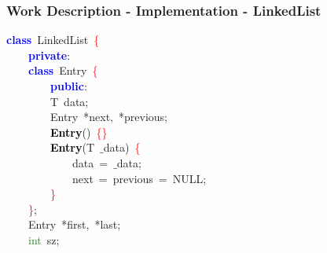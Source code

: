 \documentclass[table, usenames,dvipsnames,svgnames]{beamer}
\begin{document}
\begin{frame}

\frametitle{Work Description - Implementation - LinkedList}




\pause
\vspace{-2mm}
\begin{center}\begin{minipage}{90mm}
\begin{block}
\noindent
\mbox{}\textbf{\textcolor{Blue}{class}}\ \textcolor{TealBlue}{LinkedList}\ \textcolor{Red}{\{} \\
\mbox{}\ \ \ \ \textbf{\textcolor{Blue}{private}}\textcolor{BrickRed}{:} \\
\mbox{}\ \ \ \ \textbf{\textcolor{Blue}{class}}\ \textcolor{TealBlue}{Entry}\ \textcolor{Red}{\{} \\
\mbox{}\ \ \ \ \ \ \ \ \textbf{\textcolor{Blue}{public}}\textcolor{BrickRed}{:} \\
\mbox{}\ \ \ \ \ \ \ \ \textcolor{TealBlue}{T}\ data\textcolor{BrickRed}{;} \\
\mbox{}\ \ \ \ \ \ \ \ \textcolor{TealBlue}{Entry}\ \textcolor{BrickRed}{*}next\textcolor{BrickRed}{,}\ \textcolor{BrickRed}{*}previous\textcolor{BrickRed}{;} \\
\mbox{}\ \ \ \ \ \ \ \ \textbf{\textcolor{Black}{Entry}}\textcolor{BrickRed}{()}\ \textcolor{Red}{\{\}} \\
\mbox{}\ \ \ \ \ \ \ \ \textbf{\textcolor{Black}{Entry}}\textcolor{BrickRed}{(}\textcolor{TealBlue}{T}\ $\_$data\textcolor{BrickRed}{)}\ \textcolor{Red}{\{} \\
\mbox{}\ \ \ \ \ \ \ \ \ \ \ \ data\ \textcolor{BrickRed}{=}\ $\_$data\textcolor{BrickRed}{;} \\
\mbox{}\ \ \ \ \ \ \ \ \ \ \ \ next\ \textcolor{BrickRed}{=}\ previous\ \textcolor{BrickRed}{=}\ NULL\textcolor{BrickRed}{;} \\
\mbox{}\ \ \ \ \ \ \ \ \textcolor{Red}{\}} \\
\mbox{}\ \ \ \ \textcolor{Red}{\}}\textcolor{BrickRed}{;} \\
\mbox{}\ \ \ \ \textcolor{TealBlue}{Entry}\ \textcolor{BrickRed}{*}first\textcolor{BrickRed}{,}\ \textcolor{BrickRed}{*}last\textcolor{BrickRed}{;} \\
\mbox{}\ \ \ \ \textcolor{ForestGreen}{int}\ sz\textcolor{BrickRed}{;} 
\end{block}
\end{minipage}\end{center}

\end{frame}
\end{document}
